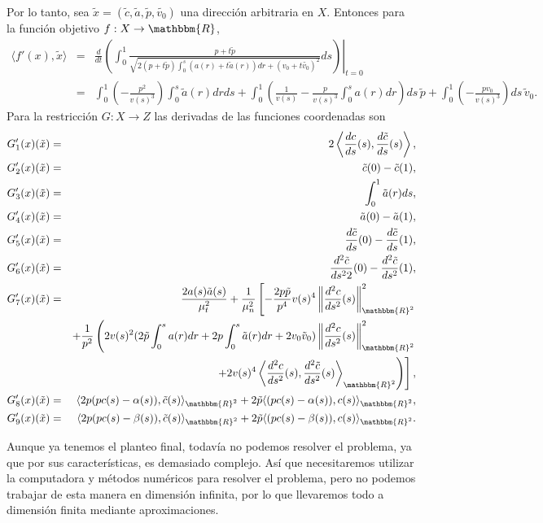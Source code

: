 \documentclass[a4paper,10pt]{book}
\newcommand{\R}{\mathbbm{R}}
\newcommand{\arr}{\rightarrow}
\begin{document}
Por lo tanto, sea $\tilde{x}=(\tilde{c},\tilde{a},\tilde{p},\tilde{v_0})$ una dirección arbitraria en $X$. Entonces para la función objetivo $f:X\arr\R$,
\begin{eqnarray*}
 \langle f'(x), \tilde{x}\rangle
&=&\frac{d}{dt}\left.\left( \int_{0}^{1}\textstyle \frac{p+t\tilde{p}}{\sqrt{2(p+t\tilde{p}) \int_0^s (a(r)+t\tilde{a}(r))dr + (v_0+t\tilde{v_0})^2}}ds\right)\right|_{t=0}\\
&=&\int_0^1\left(-\frac{p^2}{v(s)^3}\right)\int_0^s\tilde{a}(r)dr ds + \int_0^1\left(\frac{1}{v(s)}-\frac{p}{v(s)^3}\int_0^s a(r)dr\right)ds\, \tilde{p} + \int_0^1\left(-\frac{p v_0}{v(s)^3}\right)ds\, \tilde{v}_0.
\end{eqnarray*}
Para la restricción $G:X\arr Z$ las derivadas de las funciones coordenadas son
\begin{eqnarray*}
G_1'(x)(\tilde{x})
&=&2\left\langle\frac{dc}{ds}(s),\frac{d\tilde{c}}{ds}(s)\right\rangle,\\
G_2'(x)(\tilde{x})&=&\tilde{c}(0)-\tilde{c}(1),\\
G_3'(x)(\tilde{x})&=&\int_0^1 \tilde{a}(r)ds,\\
G_4'(x)(\tilde{x})&=&\tilde{a}(0)-\tilde{a}(1),\\
G_5'(x)(\tilde{x})&=&\frac{d\tilde{c}}{ds}(0)-\frac{d\tilde{c}}{ds}(1),\\
G_6'(x)(\tilde{x})&=&\frac{d^2\tilde{c}}{ds^22}(0)-\frac{d^2\tilde{c}}{ds^2}(1),\\
G_7'(x)(\tilde{x})&=&\frac{2a(s)\tilde{a}(s)}{\mu_t^2} + \frac{1}{\mu_n^2}\left[-\frac{2p\tilde{p}}{p^4}v(s)^4\left\|\frac{d^2c}{ds^2}(s)\right\|_{\R^2}^2\right.\\
&&+\frac{1}{p^2}\left(2v(s)^2(2\tilde{p}\int_0^s a(r)dr +2p\int_0^s\tilde{a}(r)dr+2v_0\tilde{v}_0) \left\|\frac{d^2c}{ds^2}(s)\right\|_{\R^2}^2\right.\\
&&\left.\left.+ 2v(s)^4\left\langle\frac{d^2c}{ds^2}(s) , \frac{d^2\tilde{c}}{ds^2}(s)\right\rangle_{\R^2}\right)\right],\\
G_8'(x)(\tilde{x})&=&\langle2p(pc(s)-\alpha(s)) , \tilde{c}(s)\rangle_{\R^2} + 2\tilde{p}\langle(pc(s)-\alpha(s)) , c(s)\rangle_{\R^2},\\
G_9'(x)(\tilde{x})&=&\langle2p(pc(s)-\beta(s)) , \tilde{c}(s)\rangle_{\R^2} + 2\tilde{p}\langle(pc(s)-\beta(s)) , c(s)\rangle_{\R^2}.\\
\end{eqnarray*}

Aunque ya tenemos el planteo final, todavía no podemos resolver el problema, ya que por sus características, es demasiado complejo. Así que necesitaremos utilizar la computadora y métodos numéricos para resolver el problema, pero no podemos trabajar de esta manera en dimensión infinita, por lo que llevaremos todo a dimensión finita mediante aproximaciones. 
\end{document}

